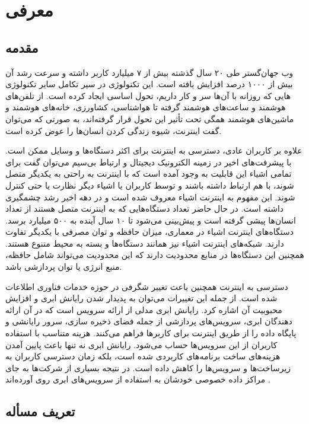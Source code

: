 \chapter{معرفی}

\section{مقدمه‌}

وب جهان‌گستر طی ۲۰ سال گذشته بیش از ۷ میلیارد کاربر داشته و سرعت رشد آن بیش از ۱۰۰۰ درصد افزایش یافته است. این تکنولوژی در سیر تکامل سایر تکنولوژی هایی که روزانه با آن‌ها سر و کار داریم، تحول اساسی ایجاد کرده است. از تلفن‌های هوشمند و ساعت‌های هوشمند گرفته تا هواشناسی، کشاورزی، خانه‌های هوشمند و ماشین‌های هوشمند همگی تحت تأثیر این تحول قرار گرفته‌اند، به صورتی که می‌توان گفت اینترنت، شیوه زندگی کردن انسان‌ها را عوض کرده ‌است.

علاوه‌ بر کاربران عادی، دسترسی به اینترنت برای اکثر دستگاه‌ها و وسایل ممکن است. با پیشرفت‌های اخیر در زمینه الکترونیک دیجیتال و ارتباط بی‌سیم می‌توان گفت برای تمامی اشیاء این قابلیت به وجود آمده است که با اینترنت به راحتی به یکدیگر متصل شوند، با هم ارتباط داشته باشند و توسط کاربران یا اشیاء دیگر نظارت یا حتی کنترل شوند. این مفهوم به اینترنت اشیاء معروف شده است و در دهه اخیر رشد چشمگیری داشته است. در حال حاضر تعداد دستگاه‌هایی که به اینترنت متصل هستند از تعداد انسان‌ها پیشی گرفته است و پیش‌بینی می‌شود تا ۱۰ سال آینده به ۵۰۰ میلیارد برسد. دستگاه‌های اینترنت اشیاء در معماری، میزان حافظه و توان مصرفی با یکدیگر تفاوت دارند. شبکه‌های اینترنت اشیاء نیز همانند دستگاه‌ها و بسته به محیط متنوع هستند. همچنین این دستگاه‌ها در منابع محدودیت دارند که این محدودیت می‌تواند شامل حافظه، منبع انرژی یا توان پردازشی باشد.

دسترسی به اینترنت همچنین باعث تغییر شگرفی در حوزه خدمات فناوری اطلاعات شده است. از جمله این تغییرات می‌توان به پدیدار شدن رایانش ابری و افزایش محبوبیت آن اشاره کرد. رایانش ابری مدلی از ارائه سرویس است که در آن ارائه دهندگان ابری، سرویس‌های پردازشی از جمله فضای ذخیره سازی، سرور‌ رایانشی و پایگاه داده‌ را از طریق اینترنت برای کاربر‌ها فراهم می‌کنند. هزینه متناسب با استفاده کاربران از این سرویس‌ها حساب می‌شود. رایانش ابری نه تنها باعث پایین آمدن هزینه‌های ساخت برنامه‌های کاربردی شده است، بلکه زمان دسترسی کاربران به زیرساخت‌ها و سرویس‌ها را کاهش داده است. در نتیجه بسیاری از شرکت‌ها به جای مراکز داده خصوصی خودشان به استفاده از سرویس‌های ابری روی آورده‌اند \cite{Kumar_2018}.
\newpage

\section{تعریف مسأله}

